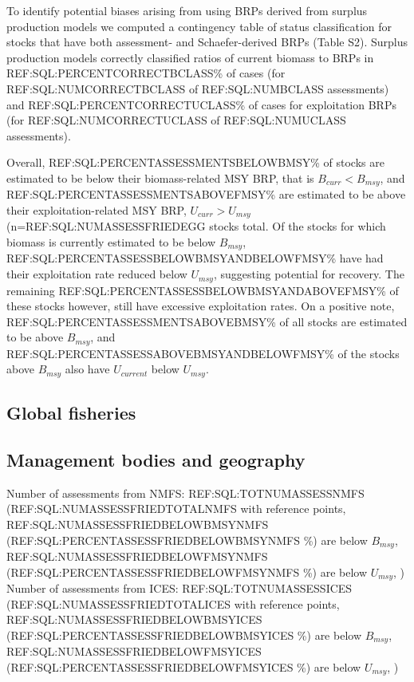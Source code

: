 To identify potential biases arising from using BRPs
derived from surplus production models we computed a contingency table
of status classification for stocks that have both assessment- and
Schaefer-derived BRPs (Table S2). Surplus production models correctly
classified ratios of current biomass to BRPs in
REF:SQL:PERCENTCORRECTBCLASS\% of cases (for REF:SQL:NUMCORRECTBCLASS
of REF:SQL:NUMBCLASS assessments) and REF:SQL:PERCENTCORRECTUCLASS\%
of cases for exploitation BRPs (for REF:SQL:NUMCORRECTUCLASS of
REF:SQL:NUMUCLASS assessments).

Overall, REF:SQL:PERCENTASSESSMENTSBELOWBMSY\% of stocks are estimated
to be below their biomass-related MSY BRP, that is $B_{curr}<B_{msy}$,
and REF:SQL:PERCENTASSESSMENTSABOVEFMSY\% are estimated to be above
their exploitation-related MSY BRP, $U_{curr}>U_{msy}$
(n=REF:SQL:NUMASSESSFRIEDEGG stocks total.
Of the stocks for which biomass is currently estimated to be below
$B_{msy}$, REF:SQL:PERCENTASSESSBELOWBMSYANDBELOWFMSY\% have had their
exploitation rate reduced below $U_{msy}$, suggesting potential for
recovery. The remaining
REF:SQL:PERCENTASSESSBELOWBMSYANDABOVEFMSY\% of these stocks however,
still have excessive exploitation rates. On a positive note,
REF:SQL:PERCENTASSESSMENTSABOVEBMSY\% of all stocks are estimated to
be above $B_{msy}$, and REF:SQL:PERCENTASSESSABOVEBMSYANDBELOWFMSY\%
of the stocks above $B_{msy}$ also have $U_{current}$ below $U_{msy}$.


\subsection*{Global fisheries}

\subsection*{Management bodies and geography}
\noindent
Number of assessments from NMFS: REF:SQL:TOTNUMASSESSNMFS (REF:SQL:NUMASSESSFRIEDTOTALNMFS with reference points, REF:SQL:NUMASSESSFRIEDBELOWBMSYNMFS (REF:SQL:PERCENTASSESSFRIEDBELOWBMSYNMFS \%) are below $B_{msy}$, REF:SQL:NUMASSESSFRIEDBELOWFMSYNMFS (REF:SQL:PERCENTASSESSFRIEDBELOWFMSYNMFS \%) are below $U_{msy}$, ) \\

Number of assessments from ICES: REF:SQL:TOTNUMASSESSICES (REF:SQL:NUMASSESSFRIEDTOTALICES with reference points, REF:SQL:NUMASSESSFRIEDBELOWBMSYICES (REF:SQL:PERCENTASSESSFRIEDBELOWBMSYICES \%) are below $B_{msy}$, REF:SQL:NUMASSESSFRIEDBELOWFMSYICES (REF:SQL:PERCENTASSESSFRIEDBELOWFMSYICES \%) are below $U_{msy}$, ) \\


